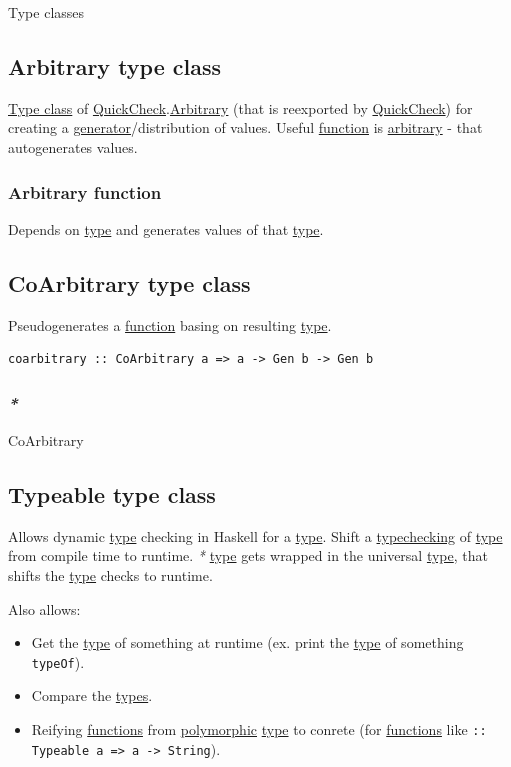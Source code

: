\documentclass[a4paper,14pt,oneside]{book}
\begin{document}
\label{org66bce48}Type classes

\subsection{\label{org457737e}Arbitrary type class}
\label{sec:org6d455a5}
\hyperref[org4b105c4]{Type class} of \hyperref[org9300761]{QuickCheck}.\hyperref[org6e95d93]{Arbitrary} (that is reexported by \hyperref[org9300761]{QuickCheck}) for creating a \hyperref[orgcc96589]{generator}/distribution of values.
Useful \hyperref[orgc39a15c]{function} is \hyperref[org6e95d93]{arbitrary} - that autogenerates values.

\subsubsection{\label{org35fb27a}Arbitrary function}
\label{sec:org32462a4}
Depends on \hyperref[orgde40363]{type} and generates values of that \hyperref[orgde40363]{type}.

\subsection{\label{org7dfb9d4}CoArbitrary type class}
\label{sec:orgb0daa92}
Pseudogenerates a \hyperref[orgc39a15c]{function} basing on resulting \hyperref[orgde40363]{type}.
\begin{verbatim}
coarbitrary :: CoArbitrary a => a -> Gen b -> Gen b
\end{verbatim}

\subsubsection{\emph{*}}
\label{sec:org85f417b}

\label{orgb90c645}CoArbitrary

\subsection{\label{org01aa253}Typeable type class}
\label{sec:orgdf6a9db}
Allows dynamic \hyperref[orgde40363]{type} checking in Haskell for a \hyperref[orgde40363]{type}.
Shift a \hyperref[orge4868ac]{typechecking} of \hyperref[orgde40363]{type} from compile time to runtime.
\emph{*} \hyperref[orgde40363]{type} gets wrapped in the universal \hyperref[orgde40363]{type}, that shifts the \hyperref[orgde40363]{type} checks to runtime.

Also allows:
\begin{itemize}
\item Get the \hyperref[orgde40363]{type} of something at runtime (ex. print the \hyperref[orgde40363]{type} of something \texttt{typeOf}).
\item Compare the \hyperref[org91cf53a]{types}.
\item Reifying \hyperref[org98c9592]{functions} from \hyperref[org5b122e2]{polymorphic} \hyperref[orgde40363]{type} to conrete (for \hyperref[org98c9592]{functions} like \texttt{:: Typeable a => a -> String}).
\end{itemize}
\end{document}
